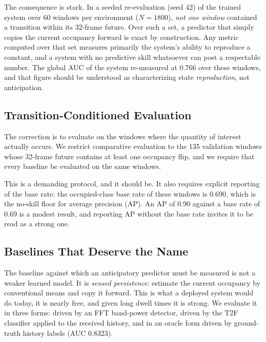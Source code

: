 \documentclass[lettersize,journal]{IEEEtran}
\begin{document}
The consequence is stark. In a seeded re-evaluation (seed 42) of the
trained system over 60 windows per environment ($N = 1800$), \emph{not
one window} contained a transition within its 32-frame future. Over such
a set, a predictor that simply copies the current occupancy forward is
exact by construction. Any metric computed over that set measures
primarily the system's ability to reproduce a constant, and a system
with no predictive skill whatsoever can post a respectable number. The
global AUC of the system re-measured at 0.766 over these windows, and
that figure should be understood as characterizing state
\emph{reproduction}, not anticipation.

\subsection{\textbf{Transition-Conditioned Evaluation}}
The correction is to evaluate on the windows where the quantity of
interest actually occurs. We restrict comparative evaluation to the 135
validation windows whose 32-frame future contains at least one occupancy
flip, and we require that every baseline be evaluated on the same
windows.

This is a demanding protocol, and it should be. It also requires
explicit reporting of the base rate: the occupied-class base rate of
these windows is 0.690, which is the no-skill floor for average
precision (AP). An AP of 0.90 against a base rate of 0.69 is a modest result,
and reporting AP without the base rate invites it to be read as a strong
one.

\subsection{\textbf{Baselines That Deserve the Name}}
The baseline against which an anticipatory predictor must be measured is
not a weaker learned model. It is \emph{sensed persistence}: estimate the
current occupancy by conventional means and copy it forward. This is what
a deployed system would do today, it is nearly free, and given long dwell
times it is strong. We evaluate it in three forms: driven by an FFT
band-power detector, driven by the T2F classifier applied to the received
history, and in an oracle form driven by ground-truth history labels
(AUC 0.8323).
\end{document}
